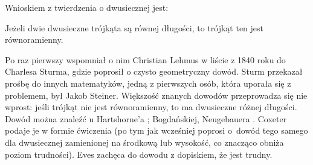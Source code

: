 %

Wnioskiem z twierdzenia o dwusiecznej jest:

\begin{theorem}
    \label{theorem_steiner_lehmus}%
	Jeżeli dwie dwusieczne trójkąta są równej długości, to trójkąt ten jest równoramienny.
\end{theorem}

Po raz pierwszy wspomniał o nim Christian Lehmus w liście z 1840 roku do Charlesa Sturma, gdzie poprosił o czysto geometryczny dowód.
%
%
Sturm przekazał prośbę do innych matematyków, jedną z pierwszych osób, która uporała się z problemem, był Jakob Steiner.
%
Większość znanych dowodów przeprowadza się nie wprost: jeśli trójkąt nie jest równoramienny, to ma dwusieczne różnej długości.
Dowód można znaleźć u Hartshorne'a \cite[s. 11]{hartshorne2000}; Bogdańskiej, Neugebauera \cite[s. 74]{neugebauer_2018}.
Coxeter \cite[s. 32]{coxeter_1967} podaje je w formie ćwiczenia (po tym jak wcześniej \cite[s. 26, 33]{coxeter_1967} poprosi o~dowód tego samego dla dwusiecznej zamienionej na środkową lub wysokość, co znacząco obniża poziom trudności).
Eves \cite[s. 19, 58]{eves1_1972} zachęca do dowodu z dopiskiem, że jest trudny. 

%